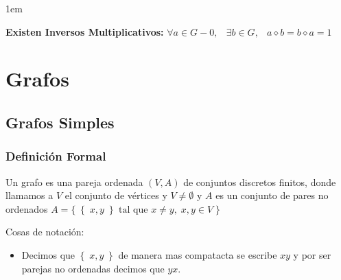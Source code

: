 \documentclass[12pt, fleqn]{report}                             %
\newenvironment{Indentation}[1][0.75em]                         %
        {\begin{adjustwidth}{#1}{}}                                 %
        {\end{adjustwidth}}                                         %
\DeclareMathOperator \Space     {\quad}                         %
\DeclareMathOperator \MiniSpace {\;}                            %
\theoremstyle{break}                                            %
\newcommand{\Set}[1]            {\left\{ \; #1 \; \right\}}     %
\newcommand{\BigSet}[1]         {\Big\{  \; #1 \; \Big\}}       %
\begin{document}
\begin{Indentation}[1em]
\begin{itemize}
{                    \item 
                        \textbf{Existen Inversos Multiplicativos:}
                        $\forall a \in G - {0}, \MiniSpace
                                \exists b \in G, \MiniSpace
                                    a \diamond b = b \diamond a = 1$

                }
                \end{itemize}
                \end{Indentation}




    \chapter{Grafos}
        \clearpage


        \clearpage
        \section{Grafos Simples}

            \subsection{Definición Formal}

                Un grafo es una pareja ordenada $(V, A)$ de conjuntos discretos finitos, donde llamamos a $V$ el conjunto de
                vértices y $V \neq \emptyset$ y $A$ es un conjunto de pares no ordenados 
                $A = \BigSet{ \Set{x, y} \text{ tal que } x \neq y, \; x, y \in V}$


                Cosas de notación:
                \begin{itemize}
                    \item Decimos que $\Set{x, y}$ de manera mas compatacta se escribe $xy$ y por ser
                    parejas no ordenadas decimos que $yx$.
                \end{itemize}
\end{document}
